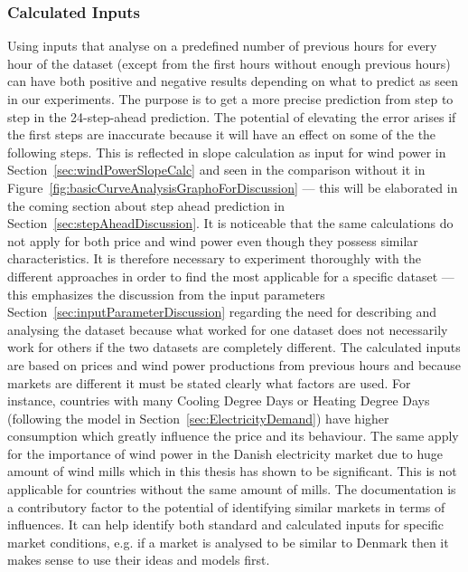 \subsubsection{Calculated Inputs}
Using inputs that analyse on a predefined number of previous hours for every hour of the dataset (except from the first hours without enough previous hours) can have both positive and negative results depending on what to predict as seen in our experiments. The purpose is to get a more precise prediction from step to step in the 24-step-ahead prediction. The potential of elevating the error arises if the first steps are inaccurate because it will have an effect on some of the the following steps. This is reflected in slope calculation as input for wind power in Section~\ref{sec:windPowerSlopeCalc} and seen in the comparison without it in Figure~\ref{fig:basicCurveAnalysisGraphoForDiscussion} --- this will be elaborated in the coming section about step ahead prediction in Section~\ref{sec:stepAheadDiscussion}. It is noticeable that the same calculations do not apply for both price and wind power even though they possess similar characteristics. It is therefore necessary to experiment thoroughly with the different approaches in order to find the most applicable for a specific dataset --- this emphasizes the discussion from the input parameters Section~\ref{sec:inputParameterDiscussion} regarding the need for describing and analysing the dataset because what worked for one dataset does not necessarily work for others if the two datasets are completely different. The calculated inputs are based on prices and wind power productions from previous hours and because markets are different it must be stated clearly what factors are used. For instance, countries with many Cooling Degree Days or Heating Degree Days (following the model in Section~\ref{sec:ElectricityDemand}) have higher consumption which greatly influence the price and its behaviour. The same apply for the importance of wind power in the Danish electricity market due to huge amount of wind mills which in this thesis has shown to be significant. This is not applicable for countries without the same amount of mills. The documentation is a contributory factor to the potential of identifying similar markets in terms of influences. It can help identify both standard and calculated inputs for specific market conditions, e.g. if a market is analysed to be similar to Denmark then it makes sense to use their ideas and models first.

